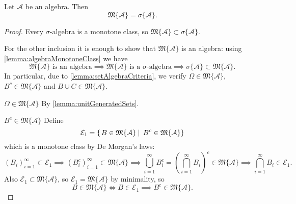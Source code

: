 \begin{proposition}
Let $\mathcal{A}$ be an algebra. Then
\[ \mathfrak{M}\{\mathcal{A}\} = \sigma\{\mathcal{A}\}. \]
\end{proposition}
\begin{proof}
Every $\sigma$-algebra is a monotone class, so $\mathfrak{M}\{\mathcal{A}\} \subset \sigma\{\mathcal{A}\}$.

For the other inclusion it is enough to show that $\mathfrak{M}\{\mathcal{A}\}$ is an algebra: using \ref{lemma:algebraMonotoneClass} we have
\[ \text{$\mathfrak{M}\{\mathcal{A}\}$ is an algebra} \implies \text{$\mathfrak{M}\{\mathcal{A}\}$ is a $\sigma$-algebra} \implies \sigma\{\mathcal{A}\}\subset\mathfrak{M}\{\mathcal{A}\}. \]
In particular, due to \ref{lemma:setAlgebraCriteria}, we verify $\Omega\in \mathfrak{M}\{\mathcal{A}\}$, $B^c \in \mathfrak{M}\{\mathcal{A}\}$ and $B\cup C \in \mathfrak{M}\{\mathcal{A}\}$.

$\boxed{\Omega\in \mathfrak{M}\{\mathcal{A}\}}$ By \ref{lemma:unitGeneratedSets}.

$\boxed{B^c \in \mathfrak{M}\{\mathcal{A}\}}$ Define
\[ \mathcal{E}_1 = \left\{\left. B\in\mathfrak{M}\{\mathcal{A}\} \;\right|\; B^c\in\mathfrak{M}\{\mathcal{A}\} \right\} \]
which is a monotone class by De Morgan's laws:
\[ (B_i)_{i=1}^\infty\subset \mathcal{E}_1 \implies (B_i^c)_{i=1}^\infty\subset \mathfrak{M}\{\mathcal{A}\} \implies \bigcup_{i=1}^\infty B_i^c = \left(\bigcap_{i=1}^\infty B_i\right)^c \in\mathfrak{M}\{\mathcal{A}\} \implies \bigcap_{i=1}^\infty B_i \in \mathcal{E}_1. \]
Also $\mathcal{E}_1\subset \mathfrak{M}\{\mathcal{A}\}$, so $\mathcal{E}_1 = \mathfrak{M}\{\mathcal{A}\}$ by minimality, so
\[ B\in\mathfrak{M}\{\mathcal{A}\} \iff B\in\mathcal{E}_1 \implies B^c\in\mathfrak{M}\{\mathcal{A}\}. \]


\end{proof}
